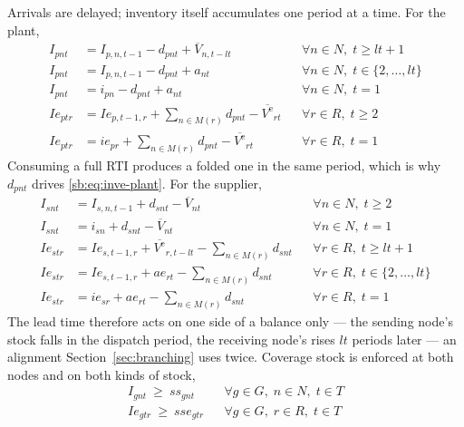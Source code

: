 Arrivals are delayed; inventory itself accumulates one period at a
time. For the plant,
\begin{align}
I_{pnt}  &=I_{p,n,t-1}-d_{pnt}+\overline{V}_{n,t-lt}
    &&\forall n\in N,\; t\ge lt+1
    \label{sb:eq:inv-plant-main}\\
I_{pnt}  &=I_{p,n,t-1}-d_{pnt}+a_{nt}
    &&\forall n\in N,\; t\in\{2,\dots,lt\}
    \label{sb:eq:inv-plant-transient}\\
I_{pnt}  &=i_{pn}-d_{pnt}+a_{nt}
    &&\forall n\in N,\; t=1
    \label{sb:eq:inv-plant-init}\\
Ie_{ptr} &=Ie_{p,t-1,r}+\sum_{n\in M(r)} d_{pnt}-\overline{V^{\mathrm{e}}}_{rt}
    &&\forall r\in R,\; t\ge 2
    \label{sb:eq:inve-plant}\\
Ie_{ptr} &=ie_{pr}+\sum_{n\in M(r)} d_{pnt}-\overline{V^{\mathrm{e}}}_{rt}
    &&\forall r\in R,\; t=1
    \label{sb:eq:inve-plant-init}
\end{align}
Consuming a full RTI produces a folded one in the same period, which is
why $d_{pnt}$ drives \eqref{sb:eq:inve-plant}. For the supplier,
\begin{align}
I_{snt}  &=I_{s,n,t-1}+d_{snt}-\overline{V}_{nt}
    &&\forall n\in N,\; t\ge 2
    \label{sb:eq:inv-sup-main}\\
I_{snt}  &=i_{sn}+d_{snt}-\overline{V}_{nt}
    &&\forall n\in N,\; t=1
    \label{sb:eq:inv-sup-init}\\
Ie_{str} &=Ie_{s,t-1,r}+\overline{V^{\mathrm{e}}}_{r,t-lt}-\sum_{n\in M(r)} d_{snt}
    &&\forall r\in R,\; t\ge lt+1
    \label{sb:eq:inve-sup-main}\\
Ie_{str} &=Ie_{s,t-1,r}+ae_{rt}-\sum_{n\in M(r)} d_{snt}
    &&\forall r\in R,\; t\in\{2,\dots,lt\}
    \label{sb:eq:inve-sup-transient}\\
Ie_{str} &=ie_{sr}+ae_{rt}-\sum_{n\in M(r)} d_{snt}
    &&\forall r\in R,\; t=1
    \label{sb:eq:inve-sup-init}
\end{align}
The lead time therefore acts on one side of a balance only --- the
sending node's stock falls in the dispatch period, the receiving node's
rises $lt$ periods later --- an alignment
Section~\ref{sec:branching} uses twice. Coverage stock is enforced at
both nodes and on both kinds of stock,
\begin{align}
I_{gnt}\ \ge\ ss_{gnt}
    &&\forall g\in G,\; n\in N,\; t\in T
    \label{sb:eq:safety-full}\\
Ie_{gtr}\ \ge\ sse_{gtr}
    &&\forall g\in G,\; r\in R,\; t\in T
    \label{sb:eq:safety-empty}
\end{align}
